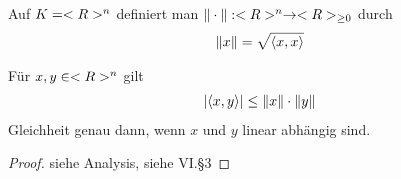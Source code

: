 \begin{definition}
	Auf $K=<R>^n$ definiert man  $\Vert \cdot \Vert:<R>^n\to <R>_{\ge 0}$ durch
	\begin{align}
		\Vert x\Vert =\sqrt{\langle  x,x\rangle}\notag
	\end{align}
\end{definition}

\begin{proposition}
	Für $x,y\in<R>^n$ gilt
	\begin{align}
		\vert \langle x,y \rangle\vert \le \Vert x\Vert \cdot \Vert y\Vert\notag
	\end{align}
	Gleichheit genau dann, wenn $x$ und $y$ linear abhängig sind.
\end{proposition}
\begin{proof}
	siehe Analysis, siehe VI.§3
\end{proof}

